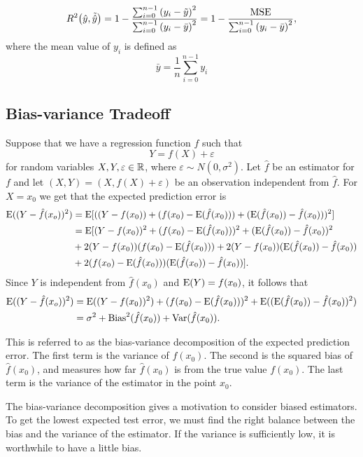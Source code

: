\begin{equation}\label{eq:R2}
    R^2 \qty(\hat{y}, \Tilde{\hat{y}}) = 1 - \frac{\sum_{i=0}^{n-1} \qty(y_i - \Tilde{y})^2 }{\sum_{i=0}^{n-1} \qty(y_i - \bar{y})^2} = 1 - \frac{\mathrm{MSE} }{\sum_{i=0}^{n-1} \qty(y_i - \bar{y})^2},
\end{equation}
where the mean value of $y_i$ is defined as
\begin{equation*}
    \bar{y} = \frac{1}{n} \sum_{i=0}^{n-1} y_i
\end{equation*}


\subsection{Bias-variance Tradeoff}\label{sec:Bias-var theory}
Suppose that we have a regression function $f$ such that
\begin{equation*}
    Y = f(X) + \varepsilon
\end{equation*}
for random variables $X,Y,\varepsilon\in\mathbb{R}$, where $\varepsilon\sim N(0,\sigma^2)$. Let $\hat{f}$ be an estimator for $f$ and let $(X,Y)=(X,f(X)+\varepsilon)$ be an observation independent from $\hat{f}$. For $X=x_0$ we get that the expected prediction error is
\begin{align*}
    \mathrm{E}((Y-\hat{f}(x_o))^2) &= \mathrm{E}[((Y-f(x_0)) + (f(x_0) - \mathrm{E}(\hat{f}(x_0))) + (\mathrm{E}(\hat{f}(x_0)) -\hat{f}(x_0)))^2]\\ &= \mathrm{E}[(Y-f(x_0))^2+(f(x_0)-\mathrm{E}(\hat{f}(x_0)))^2 + (\mathrm{E}(\hat{f}(x_0))-\hat{f}(x_0))^2\\& + 2(Y-f(x_0))(f(x_0)-\mathrm{E}(\hat{f}(x_0))) + 2(Y-f(x_0))(\mathrm{E}(\hat{f}(x_0))-\hat{f}(x_0)) \\&+ 2(f(x_0)-\mathrm{E}(\hat{f}(x_0)))(\mathrm{E}(\hat{f}(x_0))-\hat{f}(x_0))].
\end{align*}
Since $Y$ is independent from $\hat{f}(x_0)$ and $\mathrm{E}(Y)=f(x_0)$, it follows that
\begin{align*}
    \mathrm{E}((Y-\hat{f}(x_o))^2) &= \mathrm{E}((Y-f(x_0))^2) + (f(x_0)-\mathrm{E}(\hat{f}(x_0)))^2 + \mathrm{E}((\mathrm{E}(\hat{f}(x_0))-\hat{f}(x_0))^2) \\&= \sigma^2 + \mathrm{Bias}^2(\hat{f}(x_0)) + \mathrm{Var}(\hat{f}(x_0)).
\end{align*}

This is referred to as the bias-variance decomposition of the expected prediction error. The first term is the variance of $f(x_0)$. The second is the squared bias of $\hat{f}(x_0)$, and measures how far $\hat{f}(x_0)$ is from the true value $f(x_0)$. The last term is the variance of the estimator in the point $x_0$.

The bias-variance decomposition gives a motivation to consider biased estimators. To get the lowest expected test error, we must find the right balance between the bias and the variance of the estimator. If the variance is sufficiently low, it is worthwhile to have a little bias.